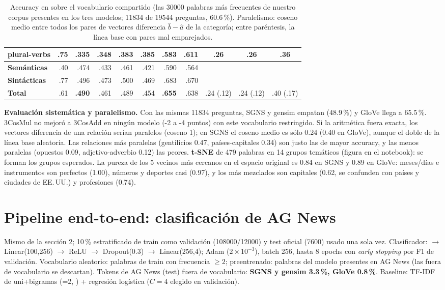 \documentclass[10pt,letterpaper]{article}
\begin{document}
\begin{table}[H]
\begin{tabular}{@{}lr|rr|rr|rr|ccc@{}}
plural-verbs & .75 & .335 & .348 & .383 & .385 & .583 & .611 & .26 & .26 & .36 \\
\midrule
\textbf{Semánticas} & .40 & .474 & .433 & .461 & .421 & .590 & .564 & & & \\
\textbf{Sintácticas} & .77 & .496 & .473 & .500 & .469 & .683 & .670 & & & \\
\textbf{Total} & .61 & \textbf{.490} & .461 & .489 & .454 & \textbf{.655} & .638 & .24 {\scriptsize(.12)} & .24 {\scriptsize(.12)} & .40 {\scriptsize(.17)} \\
\bottomrule
\end{tabular}
\caption{Accuracy en  sobre el vocabulario compartido (las \num{30000} palabras más frecuentes de
nuestro corpus presentes en los tres modelos; \num{11834} de \num{19544} preguntas, 60.6\,\%). Paralelismo: coseno medio entre
todos los pares de vectores diferencia $\hat b-\hat a$ de la categoría; entre paréntesis, la línea base con pares mal
emparejados.}
\label{tab:cat}
\end{table}

\textbf{Evaluación sistemática y paralelismo.} Con las mismas \num{11834} preguntas, SGNS y gensim empatan (48.9\,\%) y
GloVe llega a 65.5\,\%. 3CosMul no mejoró a 3CosAdd en ningún modelo (-2 a -4 puntos) con este vocabulario restringido. Si la
aritmética fuera exacta, los vectores diferencia de una relación serían paralelos (coseno 1); en SGNS el coseno medio es
sólo 0.24 (0.40 en GloVe), aunque el doble de la línea base aleatoria. Las relaciones más paralelas (gentilicios 0.47,
países-capitales 0.34) son justo las de mayor accuracy, y las menos paralelas (opuestos 0.09, adjetivo-adverbio 0.12) las
peores. \textbf{t-SNE} de 479 palabras en 14 grupos temáticos (figura en el notebook): se forman los grupos esperados.
La pureza de los 5 vecinos más cercanos en el espacio original es 0.84 en SGNS y 0.89 en GloVe: meses/días e instrumentos
son perfectos (1.00), números y deportes casi (0.97), y los más mezclados son capitales (0.62, se confunden con países y
ciudades de EE.\,UU.) y profesiones (0.74).

\section{Pipeline end-to-end: clasificación de AG News}
Mismo  de la sección 2; 10\,\% estratificado de train como validación (\num{108000}/\num{12000}) y test oficial
(\num{7600}) usado una sola vez. Clasificador:  $\to$ Linear(100,256) $\to$ ReLU $\to$ Dropout(0.3)
$\to$ Linear(256,4); Adam ($2{\times}10^{-3}$), batch 256, hasta 8 epochs con \emph{early stopping} por F1 de validación.
Vocabulario aleatorio: palabras de train con frecuencia $\ge2$; preentrenado: palabras del modelo presentes en AG News (las
fuera de vocabulario se descartan). Tokens de AG News (test) fuera de vocabulario: \textbf{SGNS y gensim 3.3\,\%, GloVe
0.8\,\%}. Baseline: TF-IDF de uni+bigramas (=2, ) + regresión logística ($C=4$ elegido en
validación).
\end{document}
